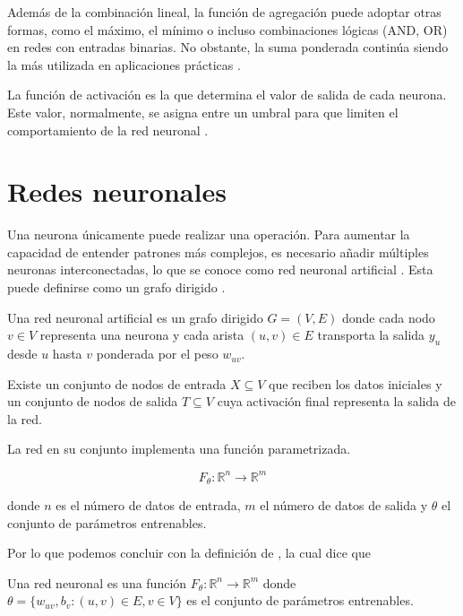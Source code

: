 Además de la combinación lineal, la función de agregación puede adoptar otras formas, como el máximo, el mínimo o incluso combinaciones lógicas (AND, OR) en redes con entradas binarias. No obstante, la suma ponderada continúa siendo la más utilizada en aplicaciones prácticas \cite{ann_extra}.

La función de activación es la que determina el valor de salida de cada neurona. Este valor, normalmente, se asigna entre un umbral para que limiten el comportamiento de la red neuronal \cite{funcion_activacion_1}.

\section{Redes neuronales}

Una neurona únicamente puede realizar una operación. Para aumentar la capacidad de entender patrones más complejos, es necesario añadir múltiples neuronas interconectadas, lo que se conoce como red neuronal artificial \cite{ann_1}. Esta puede definirse como un grafo dirigido \cite{ann_2}.

\begin{definition}
	Una red neuronal artificial es un grafo dirigido $G = (V, E)$ donde cada nodo $v \in V$ representa una neurona y cada arista $(u, v) \in E$ transporta la salida $y_u$ desde $u$ hasta $v$ ponderada por el peso $w_{uv}$. 
	
	Existe un conjunto de nodos de entrada $X \subseteq V$ que reciben los datos iniciales y un conjunto de nodos de salida $T \subseteq V$ cuya activación final representa la salida de la red.
	
\end{definition}

La red en su conjunto implementa una función parametrizada.

\[F_\theta: \mathbb{R}^n \to \mathbb{R}^m\] 

donde $n$ es el número de datos de entrada, $m$ el número de datos de salida y $\theta$ el conjunto de parámetros entrenables.

Por lo que podemos concluir con la definición de \cite{ann_3}, la cual dice que

\begin{definition}
	
	Una red neuronal es una función $F_\theta: \mathbb{R}^n \to \mathbb{R}^m$ donde $\theta = \{ w_{uv}, b_v : (u, v) \in E, v \in V \}$ es el conjunto de parámetros entrenables.
	
\end{definition}

